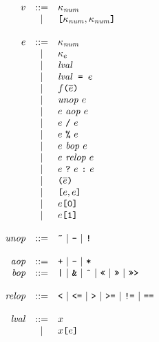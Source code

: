 \documentclass{article}
\newcommand{\ternary}[3]{{#1}\ \mathjs{?}\ {#2}\ \mathjs{:}\ {#3}}
\newcommand{\funcall}[2]{{#1}\mathjs{(}{#2}\mathjs{)}}
\newcommand{\paren}[1]{\mathjs{(}{#1}\mathjs{)}}
\newcommand{\seq}[1]{\overline{{#1}}}
\newcommand{\mathjs}[1]{\mbox{\texttt{{#1}}}}
\newcommand{\getprop}[2]{{#1}\mathjs{[}{#2}\mathjs{]}}
\newcommand{\longlong}[2]{\mathjs{[}{#1},{#2}\mathjs{]}}
\begin{document}
\[
\begin{array}{rcl}
v & ::= & \kappa_{\mathit{num}} \\
  &  |  & \longlong{\kappa_{\mathit{num}}}{\kappa_{\mathit{num}}} \\
\\
e & ::= & \kappa_{\mathit{num}} \\
  &  |  & \kappa_e \\
  &  |  & \mathit{lval} \\
  &  |  & \mathit{lval}\mathjs{ = }e \\
  &  |  & \funcall{f}{\seq{e}} \\
  &  |  & \mathit{unop}\ e \\
  &  |  & e\ \mathit{aop}\ e \\
  &  |  & e\ \mathjs{/}\ e \\
  &  |  & e\ \mathjs{\%}\ e \\
  &  |  & e\ \mathit{bop}\ e \\
  &  |  & e\ \mathit{relop}\ e \\
  &  |  & \ternary{e}{e}{e} \\
  &  |  & \paren{\seq{e}} \\
  &  |  & \longlong{e}{e} \\
  &  |  & \getprop{e}{\mathjs{0}} \\
  &  |  & \getprop{e}{\mathjs{1}} \\
\\
\mathit{unop} & ::= & \mathjs{\~{}} ~|~ \mathjs{-} ~|~ \mathjs{!} \\
\\
\mathit{aop} & ::= & \mathjs{+} ~|~ \mathjs{-} ~|~ \mathjs{*} \\
\mathit{bop} & ::= & \mathjs{|} ~|~ \mathjs{\&} ~|~ \mathjs{\^{}} ~|~ \mathjs{<<} ~|~ \mathjs{>>} ~|~ \mathjs{>>>} \\
\\
\mathit{relop} & ::= & \mathjs{<} ~|~ \mathjs{<=} ~|~ \mathjs{>} ~|~ \mathjs{>=} ~|~ \mathjs{!=} ~|~ \mathjs{==} \\
\\
\mathit{lval} & ::= & x \\
              &  |  & \getprop{x}{e} \\
\end{array}
\]
\end{document}
